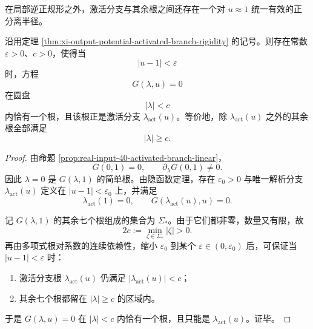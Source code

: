 在局部逆正规形之外，激活分支与其余根之间还存在一个对 \(u\approx 1\) 统一有效的正分离半径。

\begin{theorem}[激活分支在 \(u=1\) 邻域内的唯一小根性与严格尺度分离]\label{thm:xi-output-potential-activated-branch-uniform-scale-separation}
沿用定理 \ref{thm:xi-output-potential-activated-branch-rigidity} 的记号。则存在常数 \(\varepsilon>0\)、\(c>0\)，使得当
\[
|u-1|<\varepsilon
\]
时，方程
\[
G(\lambda,u)=0
\]
在圆盘
\[
|\lambda|<c
\]
内恰有一个根，且该根正是激活分支 \(\lambda_{\mathrm{act}}(u)\)。等价地，除 \(\lambda_{\mathrm{act}}(u)\) 之外的其余根全部满足
\[
|\lambda|\ge c.
\]
\end{theorem}
\begin{proof}
由命题 \ref{prop:real-input-40-activated-branch-linear}，
\[
G(0,1)=0,
\qquad
\partial_\lambda G(0,1)\neq 0.
\]
因此 \(\lambda=0\) 是 \(G(\lambda,1)\) 的简单根。由隐函数定理，存在 \(\varepsilon_0>0\) 与唯一解析分支 \(\lambda_{\mathrm{act}}(u)\) 定义在 \(|u-1|<\varepsilon_0\) 上，并满足
\[
\lambda_{\mathrm{act}}(1)=0,
\qquad
G(\lambda_{\mathrm{act}}(u),u)=0.
\]

记 \(G(\lambda,1)\) 的其余七个根组成的集合为 \(\Sigma_\ast\)。由于它们都非零，数量又有限，故
\[
2c:=\min_{\zeta\in\Sigma_\ast}|\zeta|>0.
\]
再由多项式根对系数的连续依赖性，缩小 \(\varepsilon_0\) 到某个 \(\varepsilon\in(0,\varepsilon_0)\) 后，可保证当 \(|u-1|<\varepsilon\) 时：
\begin{enumerate}
  \item 激活分支根 \(\lambda_{\mathrm{act}}(u)\) 仍满足 \(|\lambda_{\mathrm{act}}(u)|<c\)；
  \item 其余七个根都留在 \(|\lambda|\ge c\) 的区域内。
\end{enumerate}
于是 \(G(\lambda,u)=0\) 在 \(|\lambda|<c\) 内恰有一个根，且只能是 \(\lambda_{\mathrm{act}}(u)\)。证毕。
\end{proof}

\endinput
